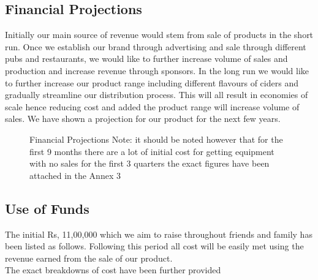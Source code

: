 \documentclass[11pt]{article}
\begin{document}
  \subsection{Financial Projections}
Initially our main source of revenue would stem from sale of products in the short run. Once we establish our brand through advertising and sale through different pubs and restaurants, we would like to further increase volume of sales and production and increase revenue through sponsors. In the long run we would like to further increase our product range including different flavours of ciders and gradually streamline our distribution process. This will all result in economies of scale hence reducing cost and added the product range will increase volume of sales. We have shown a projection for our product for the next few years.
	\begin{figure}[h!]
	\caption{Financial Projections \newline Note: it should be noted however that for the first 9 months there are a lot of initial cost for getting equipment with no sales for the first 3 quarters \newline the exact figures have been attached in the Annex 3}
	\centering
	\end{figure}


  \subsection{Use of Funds}
The initial Rs, 11,00,000 which we aim to raise throughout friends and family has been listed as follows.
Following this period all cost will be easily met using the revenue earned from the sale of our product. \\
The exact breakdowns of cost have been further provided
\end{document}
